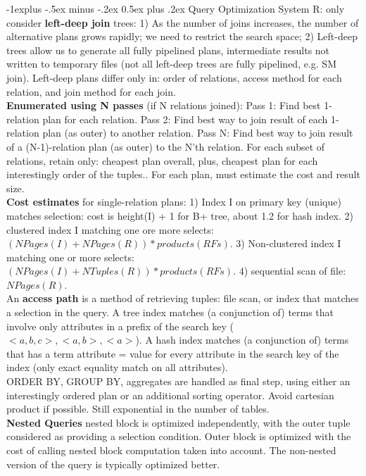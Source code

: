 \documentclass[12pt,landscape]{article}
\makeatletter
\renewcommand{\subsection}{\@startsection{subsection}{2}{0mm}%
                                {-1explus -.5ex minus -.2ex}%
                                {0.5ex plus .2ex}%
                                {\normalfont\normalsize\bfseries}}
\makeatother
\begin{document}
\begin{multicols}{3}
\subsection{Query Optimization}
System R: only consider {\bf left-deep join} trees: 1) As the number of joins increases, the number of alternative plans grows rapidly; we need to restrict the search space; 2) Left-deep trees allow us to generate all fully pipelined plans, intermediate results not written to temporary files (not all left-deep trees are fully pipelined, e.g. SM join). Left-deep plans differ only in: order of relations, access method for each relation, and join method for each join.\\
{\bf Enumerated using N passes} (if N relations joined): Pass 1: Find best 1-relation plan for each relation. Pass 2: Find best way to join result of each 1-relation plan (as outer) to another relation. Pass N: Find best way to join result of a (N-1)-relation plan (as outer) to the N'th relation. For each subset of relations, retain only: cheapest plan overall, plus, cheapest plan for each interestingly order of the tuples.. For each plan, must estimate the cost and result size.\\
{\bf Cost estimates} for single-relation plans: 1) Index I on primary key (unique) matches selection: cost is height(I) + 1 for B+ tree, about 1.2 for hash index. 2) clustered index I matching one ore more selects: $(NPages(I)+NPages(R))*products(RFs)$. 3) Non-clustered index I matching one or more selects: $(NPages(I)+NTuples(R))*products(RFs)$. 4) sequential scan of file: $NPages(R)$.\\
An {\bf access path} is a method of retrieving tuples: file scan, or index that matches a selection in the query. A tree index matches (a conjunction of) terms that involve only attributes in a prefix of the search key ($<a,b,c>, <a, b>, <a>$). A hash index matches (a conjunction of) terms that has a term attribute = value for every attribute in the search key of the index (only exact equality match on all attributes).\\
ORDER BY, GROUP BY, aggregates are handled as final step, using either an interestingly ordered plan or an additional sorting operator. Avoid cartesian product if possible. Still exponential in the number of tables.\\
{\bf Nested Queries} nested block is optimized independently, with the outer tuple considered as providing a selection condition. Outer block is optimized with the cost of calling nested block computation taken into account. The non-nested version of the query is typically optimized better.

\scriptsize


\end{multicols}
\end{document}
